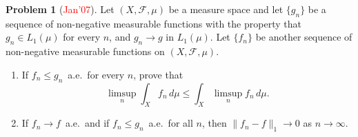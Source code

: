 \documentclass[12pt,reqno]{amsart}
\def\Lpnorm#1#2{\lVert {#1} \rVert_{#2}}
\def\redc#1{[\textcolor{red}{#1}]}
\theoremstyle{definition}
\newtheorem{problem}{Problem}
\theoremstyle{remark}
\begin{document}
\begin{problem}\redc{Jan'07}
  Let $(X, \mathcal{F}, \mu)$ be a measure space and let $\{ g_n \}$
  be a sequence of non-negative measurable functions with the property
  that $g_n \in L_1(\mu)$ for every $n$, and $g_n \to g$ in
  $L_1(\mu)$.  Let $\{ f_n \}$ be another sequence of non-negative
  measurable functions on $(X, \mathcal{F}, \mu)$.
  \begin{enumerate}
  \item If $f_n \leq g_n$~a.e.~for every $n$, prove that
    \begin{equation*}
        \limsup_n \int_X f_n\, d\mu \leq \int_X \limsup_n f_n\, d\mu.
    \end{equation*}
  \item If $f_n \to f$~a.e.~and if $f_n \leq g_n$~a.e.~for all $n$,
    then $\Lpnorm{f_n - f}{1} \to 0$ as $n \to \infty$.
  \end{enumerate}
\end{problem}
\end{document}
